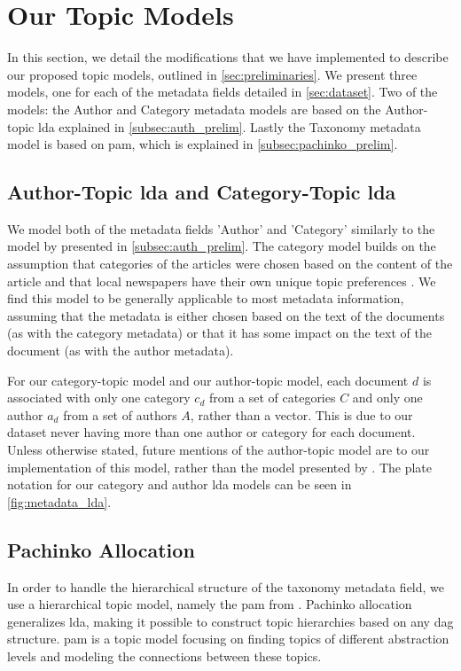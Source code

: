 \section{Our Topic Models}\label{sec:plate_notation}
In this section, we detail the modifications that we have implemented to describe our proposed topic models, outlined in \autoref{sec:preliminaries}.
We present three models, one for each of the metadata fields detailed in \autoref{sec:dataset}.
Two of the models: the Author and Category metadata models are based on the Author-topic \gls{lda} explained in \autoref{subsec:auth_prelim}.
Lastly the Taxonomy metadata model is based on \gls{pam}, which is explained in \autoref{subsec:pachinko_prelim}.

\subsection{Author-Topic \gls{lda} and Category-Topic \gls{lda}}
We model both of the metadata fields 'Author' and 'Category' similarly to the model by \citet{author_topic_2012} presented in \autoref{subsec:auth_prelim}.
The category model builds on the assumption that categories of the articles were chosen based on the content of the article and that local newspapers have their own unique topic preferences .
We find this model to be generally applicable to most metadata information, assuming that the metadata is either chosen based on the text of the documents (as with the category metadata) or that it has some impact on the text of the document (as with the author metadata).

For our category-topic model and our author-topic model, each document $d$ is associated with only one category $c_d$ from a set of categories $C$ and only one author $a_d$ from a set of authors $A$, rather than a vector.
This is due to our dataset never having more than one author or category for each document.
Unless otherwise stated, future mentions of the author-topic model are to our implementation of this model, rather than the model presented by \citet{author_topic_2012}.
The plate notation for our category and author \gls{lda} models can be seen in \autoref{fig:metadata_lda}.

\subsection{Pachinko Allocation}
In order to handle the hierarchical structure of the taxonomy metadata field, we use a hierarchical topic model, namely the \acrfull{pam} from \citet{li2006pachinko}.
Pachinko allocation generalizes \gls{lda}, making it possible to construct topic hierarchies based on any \gls{dag} structure.
\gls{pam} is a topic model focusing on finding topics of different abstraction levels and modeling the connections between these topics.

